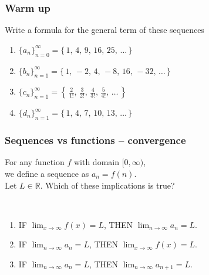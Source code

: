 \documentclass[14pt]{beamer}
\date{}
\title{}
\author{}
\newcommand {\DS} [1] {${\displaystyle #1}$}
\newcommand {\R}{\mathbb{R}}
\begin{document}
\begin{frame}[t]
\frametitle{Warm up}

Write a formula for the general term of these sequences
\vfill
\begin{enumerate}
	\item \DS{\{a_n\}_{n=0}^{\infty} = \{ \, 1, \, 4, \, 9, \, 16, \, 25, \, \ldots \, \} }
\vfill
	\item \DS{\{b_n\}_{n=1}^{\infty} = \{ \, 1, \, -2, \, 4, \, -8, \, 16, \, -32, \,  \ldots \, \} }
\vfill
	\item \DS{\{c_n\}_{n=1}^{\infty} = \left\{ \,  \frac{2}{1!}, \, \frac{3}{2!}, \, \frac{4}{3!}, \, \frac{5}{4!}, \,  \ldots \, \right\} }
\vfill
	\item \DS{\{d_n\}_{n=1}^{\infty} = \{ \,  1, \, 4, \, 7, \, 10, \, 13, \, \ldots \, \} }
\end{enumerate}

\end{frame}
\begin{frame}[t]
\frametitle{Sequences vs functions -- convergence}

For any function $f$ with domain $[0, \infty)$, \\
we define a sequence as $a_n = f(n)$. \\
Let $L \in \R$.  Which of these implications is true?

\
\begin{enumerate}
	\item  IF \DS{\lim_{x \to \infty} f(x) = L}, \;
		THEN \DS{\lim_{n \to \infty} a_n = L}.	
\vfill
	\item IF \DS{\lim_{n \to \infty} a_n = L}, \;
		 THEN \DS{\lim_{x \to \infty} f(x) = L}.
\vfill
	\item IF \DS{\lim_{n \to \infty} a_n = L}, \;
		 THEN \DS{\lim_{n \to \infty} a_{n+1} = L}.
\end{enumerate}

\end{frame}
\end{document}
